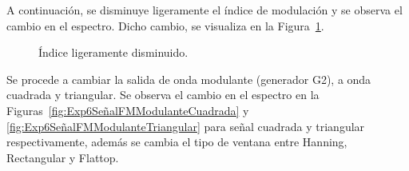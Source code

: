     A continuación, se disminuye ligeramente el índice de modulación y se 
    observa el cambio en el espectro. Dicho cambio, se visualiza en la 
    Figura~\ref{fig:Exp6SeñalFMIndiceDisminuido}.

      \begin{figure}[H]
        \centering
          \caption{Índice ligeramente disminuido.}
          \label{fig:Exp6SeñalFMIndiceDisminuido}
      \end{figure}
    
    Se procede a cambiar la salida de onda modulante (generador G2), a onda 
    cuadrada y triangular. Se observa el cambio en el espectro en la 
    Figuras~\ref{fig:Exp6SeñalFMModulanteCuadrada} y 
    \ref{fig:Exp6SeñalFMModulanteTriangular} para señal 
    cuadrada y triangular respectivamente, además se cambia el tipo 
    de ventana entre Hanning, Rectangular y Flattop.

